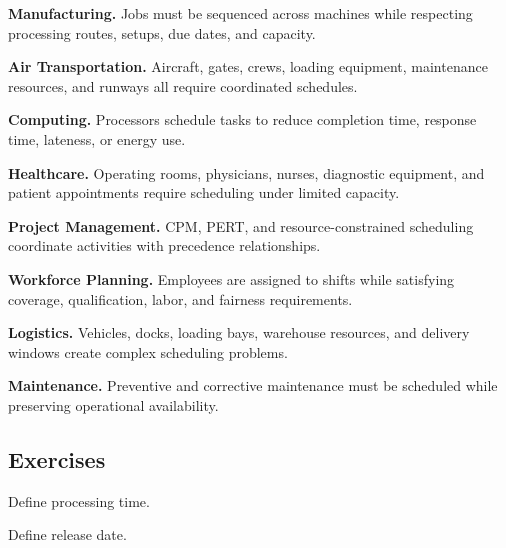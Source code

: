 \begin{applicationbox}

\textbf{Manufacturing.}
Jobs must be sequenced across machines while respecting processing routes,
setups, due dates, and capacity.

\medskip

\textbf{Air Transportation.}
Aircraft, gates, crews, loading equipment, maintenance resources, and
runways all require coordinated schedules.

\medskip

\textbf{Computing.}
Processors schedule tasks to reduce completion time, response time,
lateness, or energy use.

\medskip

\textbf{Healthcare.}
Operating rooms, physicians, nurses, diagnostic equipment, and patient
appointments require scheduling under limited capacity.

\medskip

\textbf{Project Management.}
CPM, PERT, and resource-constrained scheduling coordinate activities with
precedence relationships.

\medskip

\textbf{Workforce Planning.}
Employees are assigned to shifts while satisfying coverage, qualification,
labor, and fairness requirements.

\medskip

\textbf{Logistics.}
Vehicles, docks, loading bays, warehouse resources, and delivery windows
create complex scheduling problems.

\medskip

\textbf{Maintenance.}
Preventive and corrective maintenance must be scheduled while preserving
operational availability.

\end{applicationbox}

\subsection{Exercises}
\label{subsec:scheduling-exercises}

\begin{exercise}[1]
Define processing time.
\end{exercise}

\begin{exercise}[1]
Define release date.
\end{exercise}

